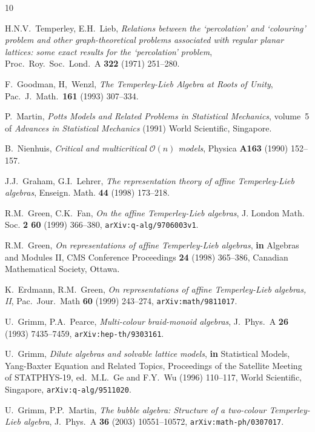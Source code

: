 \documentclass[reqno]{amsart}
\begin{document}
	\begin{thebibliography}{10}
  
	 H.N.V.~Temperley, E.H.~Lieb, {\em Relations between the `percolation' and `colouring' problem and other graph-theoretical problems associated with regular planar lattices: some exact results for the `percolation' problem}, Proc.~Roy.~Soc.~Lond.~A {\bf 322} (1971) 251--280.
  
	F.~Goodman, H,~Wenzl, {\em The Temperley-Lieb Algebra at Roots of Unity}, Pac.~J.~Math.~{\bf 161} (1993) 307--334.
  
	 P.~Martin, {\em Potts Models and Related Problems in Statistical Mechanics}, volume~5 of {\em Advances in Statistical Mechanics} (1991) World Scientific, Singapore.
	
	 B.~Nienhuis, {\em Critical and multicritical $\mathcal{O}(n)$ models}, Physica {\bf A163} (1990) 152--157. 
  
	 J.J.~Graham, G.I.~Lehrer, {\em The representation theory of affine Temperley-Lieb algebras}, Enseign. Math. {\bf 44} (1998) 173--218.
  
	 R.M.~Green, C.K.~Fan, {\em On the affine Temperley-Lieb algebras}, J. London Math. Soc. {\bf 2 60} (1999) 366--380, {\tt arXiv:q-alg/9706003v1}.
  
	 R.M.~Green, {\em On representations of affine Temperley-Lieb algebras}, {\bfseries in} Algebras and Modules II, CMS Conference Proceedings {\bf 24} (1998) 365--386, Canadian Mathematical Society, Ottawa.
  
	 K.~Erdmann, R.M.~Green, {\em On representations of affine Temperley-Lieb algebras, II}, Pac.~Jour.~Math {\bf 60} (1999) 243--274, {\tt arXiv:math/9811017}.
  
	 U.~Grimm, P.A.~Pearce, {\em Multi-colour braid-monoid algebras}, J.~Phys.~A {\bf 26} (1993) 7435--7459, {\tt arXiv:hep-th/9303161}.
  
	 U.~Grimm, {\em Dilute algebras and solvable lattice models}, {\bfseries in} Statistical Models, Yang-Baxter Equation and Related Topics, Proceedings of the Satellite Meeting of STATPHYS-19, ed.~M.L.~Ge and F.Y.~Wu (1996) 110--117, World Scientific, Singapore, {\tt arXiv:q-alg/9511020}.
  
	 U.~Grimm, P.P.~Martin, {\em The bubble algebra:
Structure of a two-colour Temperley-Lieb algebra}, J.~Phys.~A {\bf 36} (2003) 10551--10572, {\tt arXiv:math-ph/0307017}.
  

\end{thebibliography}
\end{document}

